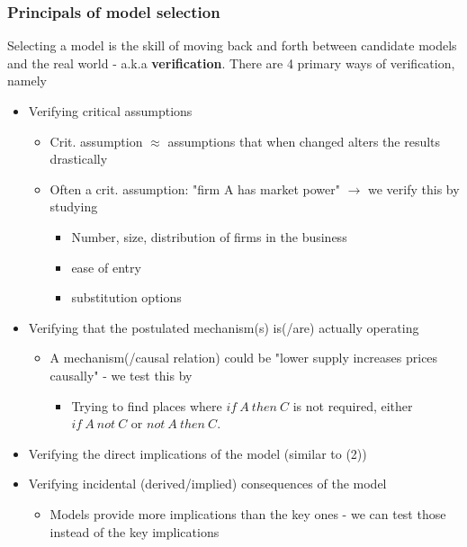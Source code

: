 \documentclass[12pt, a4paper]{article}
\begin{document}
\begin{multicols}{2}
\subsubsection{Principals of model selection}
Selecting a model is the skill of moving back and forth between candidate models and the real world - a.k.a \textbf{verification}. There are 4 primary ways of verification, namely 
\begin{itemize}
\item[1)] Verifying critical assumptions
\begin{itemize}
\item Crit. assumption $\approx$ assumptions that when changed alters the results drastically
\item Often a crit. assumption: "firm A has market power" $\rightarrow$ we verify this by studying 
\begin{itemize}
\item[a)] Number, size, distribution of firms in the business 
\item[b)] ease of entry
\item[c)] substitution options
\end{itemize}
\end{itemize}
\item[2)] Verifying that the postulated mechanism(s) is(/are) actually operating
\begin{itemize}
\item A mechanism(/causal relation) could be "lower supply increases prices causally" - we test this by
\begin{itemize}
\item[a)] Trying to find places where $if \ A \ then \ C$ is not required, either $if \ A \ not \ C$ or $not \ A \ then \ C$.
\end{itemize}
\end{itemize}
\item[3)] Verifying the direct implications of the model (similar to (2))
\item[4)] Verifying incidental (derived/implied) consequences of the model
\begin{itemize}
\item Models provide more implications than the key ones - we can test those instead of the key implications
\end{itemize}
\end{itemize}



\end{multicols}
\end{document}
